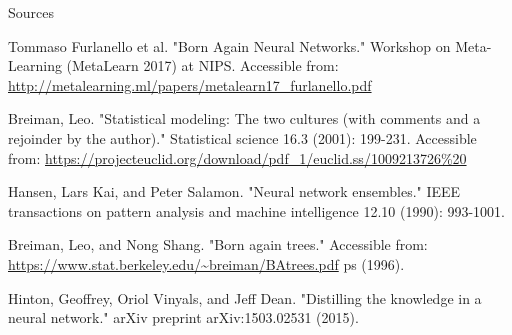 \documentclass{beamer}
\begin{document}
\begin{frame}{Sources}

\begin{thebibliography}{0}

   Tommaso Furlanello et al. "Born Again Neural Networks." Workshop on Meta-Learning (MetaLearn 2017) at NIPS. Accessible from: \url{http://metalearning.ml/papers/metalearn17_furlanello.pdf}
  
   Breiman, Leo. "Statistical modeling: The two cultures (with comments and a rejoinder by the author)." Statistical science 16.3 (2001): 199-231. Accessible from: \url{https://projecteuclid.org/download/pdf_1/euclid.ss/1009213726\%20}
  
   Hansen, Lars Kai, and Peter Salamon. "Neural network ensembles." IEEE transactions on pattern analysis and machine intelligence 12.10 (1990): 993-1001.
  
   Breiman, Leo, and Nong Shang. "Born again trees." Accessible from: \url{https://www.stat.berkeley.edu/~breiman/BAtrees.pdf} ps (1996).
  
   Hinton, Geoffrey, Oriol Vinyals, and Jeff Dean. "Distilling the knowledge in a neural network." arXiv preprint arXiv:1503.02531 (2015).
  
  
\end{thebibliography}

\end{frame}
 
 
 
\end{document}
